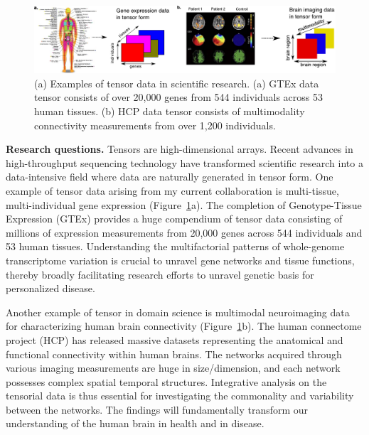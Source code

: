 \documentclass[11pt]{article}
\theoremstyle{plain}
\theoremstyle{definition}
\begin{document}
\begin{figure}[H]
\begin{center}
\includegraphics[width=1\textwidth]{example.pdf}
\caption{ \small (a) Examples of tensor data in scientific research. (a) GTEx data tensor consists of over 20,000 genes from 544 individuals across 53 human tissues. (b) HCP data tensor consists of multimodality connectivity measurements from over 1,200 individuals.}\label{fig:0}
\end{center}
\end{figure} 
\vspace{-.6cm}

{\bf Research questions.} Tensors are high-dimensional arrays. Recent advances in high-throughput sequencing technology have transformed scientific research into a data-intensive field where data are naturally generated in tensor form. One example of tensor data arising from my current collaboration is multi-tissue, multi-individual gene expression (Figure~\ref{fig:0}a). The completion of Genotype-Tissue Expression (GTEx) provides a huge compendium of tensor data consisting of millions of expression measurements from 20,000 genes across 544 individuals and 53 human tissues. Understanding the multifactorial patterns of whole-genome transcriptome variation is crucial to unravel gene networks and tissue functions, thereby broadly facilitating research efforts to unravel genetic basis for personalized disease.

Another example of tensor in domain science is multimodal neuroimaging data for characterizing human brain connectivity (Figure~\ref{fig:0}b). The human connectome project (HCP) has released massive datasets representing the anatomical and functional connectivity within human brains. The networks acquired through various imaging measurements are huge in size/dimension, and each network possesses complex spatial temporal structures. Integrative analysis on the tensorial data is thus essential for investigating the commonality and variability between the networks. The findings will fundamentally transform our understanding of the human brain in health and in disease.
\end{document}
